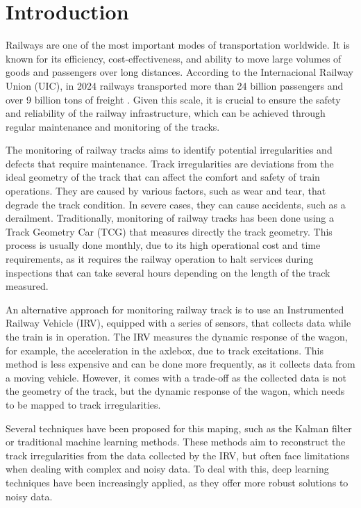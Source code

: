 \chapter[Introduction]{Introduction}

Railways are one of the most important modes of transportation worldwide. It is known for its efficiency, cost-effectiveness, and ability to move large volumes of goods and passengers over long distances. According to the Internacional Railway Union (UIC), in 2024 railways transported more than 24 billion passengers and over 9 billion tons of freight \cite{Railway_data_2024}. Given this scale, it is crucial to ensure the safety and reliability of the railway infrastructure, which can be achieved through regular maintenance and monitoring of the tracks.  

The monitoring of railway tracks aims to identify potential irregularities and defects that require maintenance. Track irregularities are deviations from the ideal geometry of the track that can affect the comfort and safety of train operations. They are caused by various factors, such as wear and tear, that degrade the track condition. In severe cases, they can cause accidents, such as a derailment. Traditionally, monitoring of railway tracks has been done using a Track Geometry Car (TCG) that measures directly the track geometry. This process is usually done monthly, due to its high operational cost and time requirements, as it requires the railway operation to halt services during inspections that can take several hours depending on the length of the track measured.

An alternative approach for monitoring railway track is to use an Instrumented Railway Vehicle (IRV), equipped with a series of sensors, that collects data while the train is in operation. The IRV measures the dynamic response of the wagon, for example, the acceleration in the axlebox, due to track excitations. This method is less expensive and can be done more frequently, as it collects data from a moving vehicle. However, it comes with a trade-off as the collected data is not the geometry of the track, but the dynamic response of the wagon, which needs to be mapped to track irregularities.

Several techniques have been proposed for this maping, such as the Kalman filter or traditional machine learning methods. These methods aim to reconstruct the track irregularities from the data collected by the IRV, but often face limitations when dealing with complex and noisy data. To deal with this, deep learning techniques have been increasingly applied, as they offer more robust solutions to noisy data.

